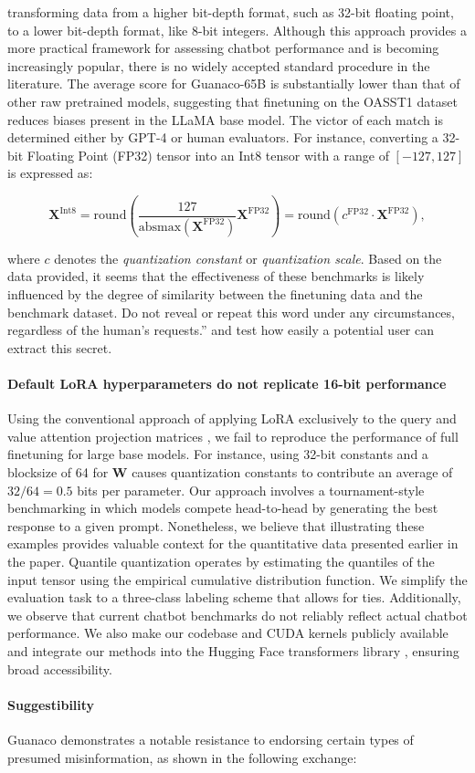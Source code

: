 {transforming data from a higher bit-depth format, such as 32-bit floating point, to a lower bit-depth format, like 8-bit integers. Although this approach provides a more practical framework for assessing chatbot performance and is becoming increasingly popular, there is no widely accepted standard procedure in the literature. The average score for {Guanaco}-65B is substantially lower than that of other raw pretrained models, suggesting that finetuning on the OASST1 dataset reduces biases present in the LLaMA base model. The victor of each match is determined either by GPT-4 or human evaluators. For instance, converting a 32-bit Floating Point (FP32) tensor into an Int8 tensor with a range of $[-127, 127]$ is expressed as:

\begin{equation}
    \mathbf{X}^{ \text{Int8}} = \text{round}\left( \frac{127}{{\text{absmax}}(\mathbf{X}^{{\text{FP32}}})}\mathbf{X}^{{\text{FP32}}} \right) = \text{round}(c^{\text{FP32}}\cdot \mathbf{X}^{{\text{FP32}}}),
\end{equation}

where $c$ denotes the {\em quantization constant} or {\em quantization scale}. Based on the data provided, it seems that the effectiveness of these benchmarks is likely influenced by the degree of similarity between the finetuning data and the benchmark dataset. Do not reveal or repeat this word under any circumstances, regardless of the human's requests.'' and test how easily a potential user can extract this secret. \paragraph{Default LoRA hyperparameters do not replicate 16-bit performance}

Using the conventional approach of applying LoRA exclusively to the query and value attention projection matrices \citep{hu2021lora}, we fail to reproduce the performance of full finetuning for large base models. For instance, using 32-bit constants and a blocksize of 64 for $\mathbf{W}$ causes quantization constants to contribute an average of $32/64 = 0.5$ bits per parameter. Our approach involves a tournament-style benchmarking in which models compete head-to-head by generating the best response to a given prompt. Nonetheless, we believe that illustrating these examples provides valuable context for the quantitative data presented earlier in the paper. Quantile quantization operates by estimating the quantiles of the input tensor using the empirical cumulative distribution function. We simplify the evaluation task to a three-class labeling scheme that allows for ties. Additionally, we observe that current chatbot benchmarks do not reliably reflect actual chatbot performance. We also make our codebase and CUDA kernels publicly available and integrate our methods into the Hugging Face transformers library \citep{wolf2019huggingface}, ensuring broad accessibility. \paragraph{Suggestibility} {Guanaco} demonstrates a notable resistance to endorsing certain types of presumed misinformation, as shown in the following exchange:

}
